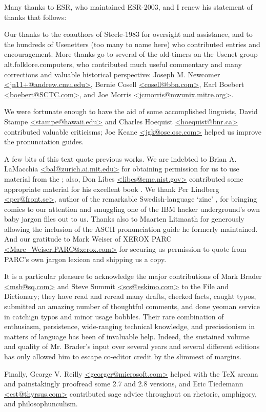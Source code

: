 Many thanks to ESR, who maintained ESR-2003, and I renew his statement of
thanks that follows:

Our thanks to the coauthors of Steele-1983 for oversight and assistance, and to
the hundreds of Usenetters (too many to name here) who contributed entries and
encouragement. More thanks go to several of the old-timers on the Usenet group
alt.folklore.computers, who contributed much useful commentary and many
corrections and valuable historical perspective: Joseph M. Newcomer
\url{<jn11+@andrew.cmu.edu>}, Bernie Cosell \url{<cosell@bbn.com>}, Earl
Boebert \url{<boebert@SCTC.com>}, and Joe Morris
\url{<jcmorris@mwunix.mitre.org>}.

We were fortunate enough to have the aid of some accomplished linguists, David
Stampe \url{<stampe@hawaii.edu>} and Charles Hoequist \url{<hoequist@bnr.ca>}
contributed valuable criticisms; Joe Keane \url{<jgk@osc.osc.com>} helped us
improve the pronunciation guides.

A few bits of this text quote previous works. We are indebted to Brian A.
LaMacchia \url{<bal@zurich.ai.mit.edu>} for obtaining permission for us to use
material from the ; also, Don Libes
\url{<libes@cme.nist.gov>} contributed some appropriate material for his
excellent book . We thank Per Lindberg
\url{<per@front.se>}, author of the remarkable Swedish-language `zine'
, for bringing  comics to our attention
and smuggling one of the IBM hacker underground's own baby jargon files out to
us. Thanks also to Maarten Litmaath for generously allowing the inclusion of
the ASCII pronunciation guide he formerly maintained. And our gratitude to Mark
Weiser of XEROX PARC \url{<Marc_Weiser.PARC@xerox.com>} for securing us
permission to quote from PARC's own jargon lexicon and shipping us a copy.

It is a particular pleasure to acknowledge the major contributions of Mark
Brader \url{<msb@sq.com>} and Steve Summit \url{<scs@eskimo.com>} to the File
and Dictionary; they have read and reread many drafts, checked facts, caught
typos, submitted an amazing number of thoughtful comments, and done yeoman
service in catchign typos and minor usage bobbles. Their rare combination of
enthusiasm, persistence, wide-ranging technical knowledge, and precissionism in
matters of language has been of invaluable help. Indeed, the sustained volume
and quality of Mr. Brader's input over several years and several different
editions has only allowed him to escape co-editor credit by the slimmest of
margins.

Finally, George V. Reilly \url{<georger@microsoft.com>} helped with the TeX
arcana and painstakingly proofread some 2.7 and 2.8 versions, and Eric
Tiedemann \url{<est@thyrsus.com>} contributed sage advice throughout on
rhetoric, amphigory, and philosophunculism.

